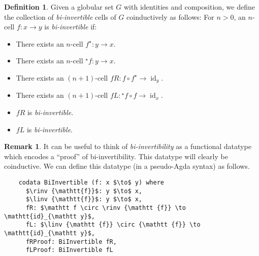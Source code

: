 \documentclass{article}
\theoremstyle{definition}
\newtheorem{definition}{Definition}
\newtheorem{remark}{Remark}
\theoremstyle{examplestyle}
\DeclareMathOperator{\id}{id}
\newcommand{\linv}[1]{{}^\star\!#1}
\newcommand{\rinv}[1]{#1^\star}
\begin{document}
\begin{definition}
  Given a globular set \(G\) with identities and composition, we define the collection of \emph{bi-invertible} cells of \(G\) coinductively as follows: For \(n > 0\), an \(n\)-cell \(f: x \to y\) is \emph{bi-invertible} if:
  \begin{itemize}
  \item There exists an \(n\)-cell \(\rinv f: y \to x\).
  \item There exists an \(n\)-cell \(\linv f: y \to x\).
  \item There exists an \((n+1)\)-cell \(fR: f \circ \rinv f \to \id_y\).
  \item There exists an \((n+1)\)-cell \(fL: \linv f \circ f \to \id_x\).
  \item \(fR\) is \emph{bi-invertible}.
  \item \(fL\) is \emph{bi-invertible}.
  \end{itemize}
\end{definition}

\begin{remark}
  It can be useful to think of \emph{bi-invertibility} as a functional datatype which encodes a ``proof'' of bi-invertibility. This datatype will clearly be coinductive. We can define this datatype (in a pseudo-Agda syntax) as follows.

  \begin{lstlisting}
    codata BiInvertible (f: x $\to$ y) where
      $\rinv {\mathtt{f}}$: y $\to$ x,
      $\linv {\mathtt{f}}$: y $\to$ x,
      fR: $\mathtt f \circ \rinv {\mathtt {f}} \to \mathtt{id}_{\mathtt y}$,
      fL: $\linv {\mathtt {f}} \circ {\mathtt {f}} \to \mathtt{id}_{\mathtt y}$,
      fRProof: BiInvertible fR,
      fLProof: BiInvertible fL
  \end{lstlisting}
\end{remark}
\end{document}
